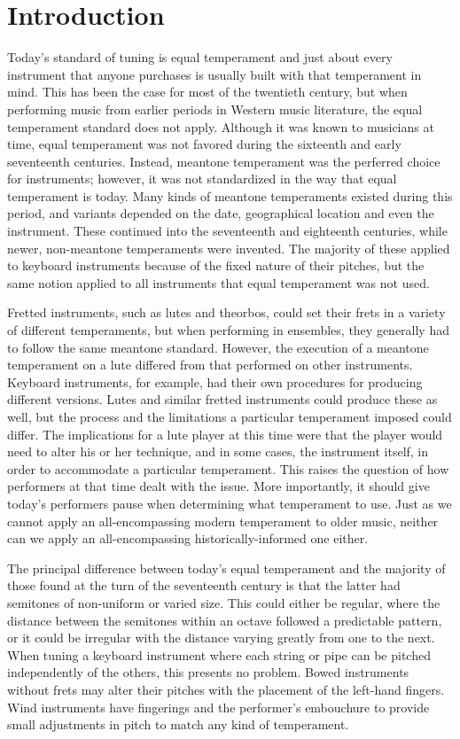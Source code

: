 \chapter*{Introduction}

Today's standard of tuning is equal temperament and just about every instrument
that anyone purchases is usually built with that temperament in mind.  This has
been the case for most of the twentieth century, but when performing music from
earlier periods in Western music literature, the equal temperament standard does
not apply.  Although it was known to musicians at time, equal temperament was
not favored during the sixteenth and early seventeenth centuries.  Instead,
meantone temperament was the perferred choice for instruments; however, it was
not standardized in the way that equal temperament is today.  Many kinds of
meantone temperaments existed during this period, and variants depended on the
date, geographical location and even the instrument.  These continued into the
seventeenth and eighteenth centuries, while newer, non-meantone temperaments
were invented.  The majority of these applied to keyboard instruments because of
the fixed nature of their pitches, but the same notion applied to all
instruments that equal temperament was not used.

Fretted instruments, such as lutes and theorbos, could set their frets in a
variety of different temperaments, but when performing in ensembles, they
generally had to follow the same meantone standard.  However, the execution of a
meantone temperament on a lute differed from that performed on other
instruments. Keyboard instruments, for example, had their own procedures for
producing different versions.  Lutes and similar fretted instruments could
produce these as well, but the process and the limitations a particular
temperament imposed could differ. The implications for a lute player at this
time were that the player would need to alter his or her technique, and in some
cases, the instrument itself, in order to accommodate a particular temperament.
This raises the question of how performers at that time dealt with the issue.
More importantly, it should give today's performers pause when determining what
temperament to use.  Just as we cannot apply an all-encompassing modern
temperament to older music, neither can we apply an all-encompassing
historically-informed one either.

The principal difference between today's equal temperament and the majority of
those found at the turn of the seventeenth century is that the latter had
semitones of non-uniform or varied size.  This could either be regular, where
the distance between the semitones within an octave followed a predictable
pattern, or it could be irregular with the distance varying greatly from one to
the next. When tuning a keyboard instrument where each string or pipe can be
pitched independently of the others, this presents no problem.  Bowed
instruments without frets may alter their pitches with the placement of the
left-hand fingers.  Wind instruments have fingerings and the performer's
embouchure to provide small adjustments in pitch to match any kind of
temperament.

